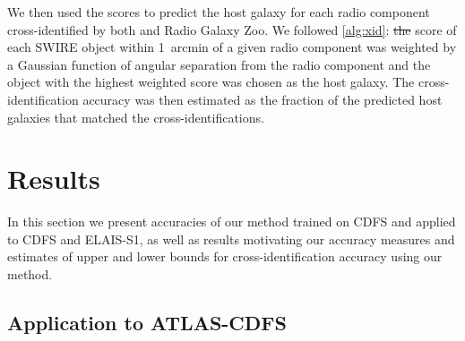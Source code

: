 \documentclass[11pt, a4paper]{book}
\providecommand{\DIFaddtex}[1]{{\protect\color{blue}\uwave{#1}}} %
\providecommand{\DIFdeltex}[1]{{\protect\color{red}\sout{#1}}}                      %
\providecommand{\DIFaddbegin}{} %
\providecommand{\DIFaddend}{} %
\providecommand{\DIFdelbegin}{} %
\providecommand{\DIFdelend}{} %
\providecommand{\DIFadd}[1]{\texorpdfstring{\DIFaddtex{#1}}{#1}} %
\providecommand{\DIFdel}[1]{\texorpdfstring{\DIFdeltex{#1}}{}} %
\newcommand{\DIFscaledelfig}{0.5}
\newlength{\DIFdelgraphicswidth} %
\newlength{\DIFdelgraphicsheight} %
\newcommand{\DIFaddincludegraphics}[2][]{{\color{blue}\fbox{\DIFOincludegraphics[#1]{#2}}}} %
\newcommand{\DIFdelincludegraphics}[2][]{%
\sbox{\DIFdelgraphicsbox}{\DIFOincludegraphics[#1]{#2}}%
\settoboxwidth{\DIFdelgraphicswidth}{\DIFdelgraphicsbox} %
\settoboxtotalheight{\DIFdelgraphicsheight}{\DIFdelgraphicsbox} %
\scalebox{\DIFscaledelfig}{%
\parbox[b]{\DIFdelgraphicswidth}{\usebox{\DIFdelgraphicsbox}\\[-\baselineskip] \rule{\DIFdelgraphicswidth}{0em}}\llap{\resizebox{\DIFdelgraphicswidth}{\DIFdelgraphicsheight}{%
\setlength{\unitlength}{\DIFdelgraphicswidth}%
\begin{picture}(1,1)%
\thicklines\linethickness{2pt} %
{\color[rgb]{1,0,0}\put(0,0){\framebox(1,1){}}}%
{\color[rgb]{1,0,0}\put(0,0){\line( 1,1){1}}}%
{\color[rgb]{1,0,0}\put(0,1){\line(1,-1){1}}}%
\end{picture}%
}\hspace*{3pt}}} %
} %
\DeclareRobustCommand{\DIFaddbegin}{\DIFOaddbegin \let\includegraphics\DIFaddincludegraphics} %
\DeclareRobustCommand{\DIFaddend}{\DIFOaddend \let\includegraphics\DIFOincludegraphics} %
\DeclareRobustCommand{\DIFdelbegin}{\DIFOdelbegin \let\includegraphics\DIFdelincludegraphics} %
\DeclareRobustCommand{\DIFdelend}{\DIFOaddend \let\includegraphics\DIFOincludegraphics} %
\begin{document}
    We then used the scores to predict the host galaxy
    for each radio component cross-identified by both \citet{norris06} and
    Radio Galaxy Zoo. {We followed \autoref{alg:xid}:
    \DIFdelbegin \DIFdel{the }\DIFdelend \DIFaddbegin \DIFadd{The }\DIFaddend score of each SWIRE object within 1~arcmin of a given radio
    component was weighted by a Gaussian function of angular separation from the
    radio component and the object with the highest
    weighted score was chosen as the host galaxy.} The
    {cross-identification accuracy} was then estimated as the
    fraction of the predicted host galaxies that matched the \citet{norris06}
    cross-identifications.

\section{Results}\label{sec:atlas-xid-results}

  In this section we present accuracies of our method trained on CDFS and
  applied to CDFS and ELAIS-S1, as well as results motivating our accuracy
  measures and estimates of upper and lower bounds for cross-identification
  accuracy using our method.

  \subsection{Application to ATLAS-CDFS}
  \label{sec:atlas-xid-cdfs-results}
\end{document}
